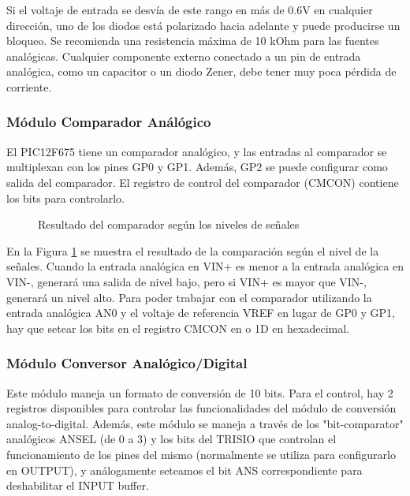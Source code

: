 \documentclass[a4paper]{article}
\begin{document}
Si el voltaje de entrada se desvía de este rango en más de 0.6V
en cualquier dirección, uno de los diodos está polarizado hacia adelante
y puede producirse un bloqueo. Se recomienda una resistencia máxima de 10 kOhm para las fuentes analógicas.
Cualquier componente externo conectado a un pin de entrada analógica,
como un capacitor o un diodo Zener, debe tener muy poca pérdida de corriente.

\subsubsection*{Módulo Comparador Análógico}

El PIC12F675 tiene un comparador analógico, y las entradas al
comparador se multiplexan con los pines GP0 y GP1.
Además, GP2 se puede configurar como salida del comparador.
El registro de control del comparador (CMCON) contiene
los bits para controlarlo.
		
\begin{figure}[h]\centering
    \caption{Resultado del comparador según los niveles de señales}
    \label{fig:analog-signal}
\end{figure}

En la Figura \ref{fig:analog-signal} se muestra el resultado de la 
comparación según el nivel de la señales. Cuando la entrada 
analógica en VIN+ es menor a la entrada
analógica en VIN-, generará una salida de nivel bajo, pero si VIN+
es mayor que VIN-, generará un nivel alto.
Para poder trabajar con el comparador
utilizando la entrada analógica AN0 y el voltaje de referencia VREF 
en lugar de GP0 y GP1, hay que setear los bits en el registro CMCON 
en {} o {\ttfamily 1D} en hexadecimal.

\subsubsection*{Módulo Conversor Analógico/Digital}

Este módulo maneja un formato de conversión de 10 bits. Para el 
control, hay 2 registros disponibles para controlar las 
funcionalidades del módulo de conversión analog-to-digital. Además, 
este módulo se maneja a través de los "bit-comparator" analógicos
ANSEL (de 0 a 3) y los bits del TRISIO que controlan el 
funcionamiento de los pines del mismo (normalmente se utiliza para 
configurarlo en OUTPUT), y análogamente seteamos el bit ANS 
correspondiente para deshabilitar el INPUT buffer.
\end{document}
